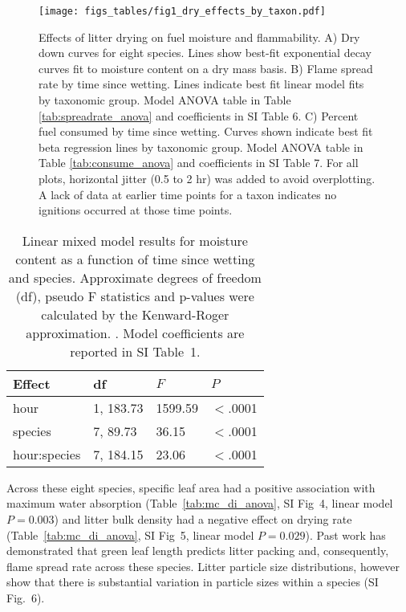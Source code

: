 \documentclass[letterpaper,12pt]{article}
\begin{document}
\begin{figure}
  \centering
  \texttt{[image: figs\_tables/fig1\_dry\_effects\_by\_taxon.pdf]}
  \caption{}
\end{figure}
\begin{figure}
  \captionsetup{labelformat=adja-page}
  \ContinuedFloat
\caption{Effects of litter drying on fuel moisture and flammability. A) Dry
  down curves for eight species. Lines show best-fit exponential decay curves
  fit to moisture content on a dry mass basis. B) Flame spread rate by time
  since wetting. Lines indicate best fit linear model fits by taxonomic group.
  Model ANOVA table in Table \ref{tab:spreadrate_anova} and coefficients in SI
  Table 6. C) Percent fuel consumed by time since wetting. Curves shown
  indicate best fit beta regression lines by taxonomic group. Model ANOVA table
  in Table \ref{tab:consume_anova} and coefficients in SI Table 7. For all
  plots, horizontal jitter (0.5 to 2 hr) was added to avoid overplotting. A
  lack of data at earlier time points for a taxon indicates no ignitions
  occurred at those time points. }
 \label{fig:drydown}
\end{figure}

\begin{table}
  \caption{Linear mixed model results for moisture content as a function of
    time since wetting and species. Approximate degrees of freedom (df), pseudo F
    statistics and p-values were calculated by the Kenward-Roger approximation.
    \citep{Kenward_Roger-1997}. Model coefficients are reported in SI Table~1.
  \label{tab:drydown}}
\centering
\begin{tabular}{llll}
  \toprule
Effect & df & $F$ & $P$ \\ 
  \midrule
  hour & 1, 183.73 & 1599.59 & $<$.0001 \\ 
  species & 7, 89.73 & 36.15 & $<$.0001 \\ 
  hour:species & 7, 184.15 & 23.06 & $<$.0001 \\ 
   \bottomrule
\end{tabular}
\end{table}

Across these eight species, specific leaf area had a positive association with
maximum water absorption (Table~\ref{tab:mc_di_anova}, SI Fig~4, linear model
$P = 0.003$) and litter bulk density had a negative effect on drying rate
(Table~\ref{tab:mc_di_anova}, SI Fig~5, linear model $P = 0.029$). Past work
has demonstrated that green leaf length predicts litter packing and,
consequently, flame spread rate across these species. Litter particle size
distributions, however show that there is substantial variation in particle
sizes within a species (SI Fig.~6).
\end{document}
